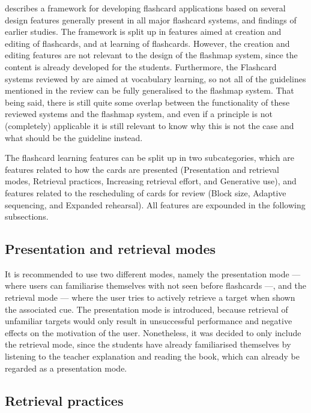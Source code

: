  describes a framework for developing flashcard applications based on several design features generally present in all major flashcard systems, and findings of earlier studies. The framework is split up in features aimed at creation and editing of flashcards, and at learning of flashcards. However, the creation and editing features are not relevant to the design of the flashmap system, since the content is already developed for the students. Furthermore, the Flashcard systems reviewed by  are aimed at vocabulary learning, so not all of the guidelines mentioned in the review can be fully generalised to the flashmap system. That being said, there is still quite some overlap between the functionality of these reviewed systems and the flashmap system, and even if a principle is not (completely) applicable it is still relevant to know why this is not the case and what should be the guideline instead.

The flashcard learning features can be split up in two subcategories, which are features related to how the cards are presented (Presentation and retrieval modes, Retrieval practices, Increasing retrieval effort, and Generative use), and features related to the rescheduling of cards for review (Block size, Adaptive sequencing, and Expanded rehearsal). All features are expounded in the following subsections.

        \subsection{Presentation and retrieval modes}

It is recommended to use two different modes, namely the presentation mode --- where users can familiarise themselves with not seen before flashcards ---, and the retrieval mode --- where the user tries to actively retrieve a target when shown the associated cue. The presentation mode is introduced, because retrieval of unfamiliar targets would only result in unsuccessful performance and negative effects on the motivation of the user. Nonetheless, it was decided to only include the retrieval mode, since the students have already familiarised themselves by listening to the teacher explanation and reading the book, which can already be regarded as a presentation mode.

        \subsection{Retrieval practices}

